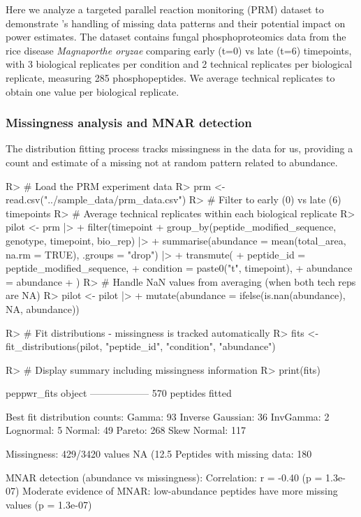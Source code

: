 \documentclass[article]{jss}
\begin{document}
Here we analyze a targeted parallel reaction monitoring (PRM) dataset to demonstrate 's handling of missing data patterns and their potential impact on power estimates. The dataset contains fungal phosphoproteomics data from the rice disease \emph{Magnaporthe oryzae} comparing early (t=0) vs late (t=6) timepoints, with 3 biological replicates per condition and 2 technical replicates per biological replicate, measuring 285 phosphopeptides. We average technical replicates to obtain one value per biological replicate.

\subsubsection{Missingness analysis and MNAR detection}

The distribution fitting process tracks missingness in the data for us, providing a count and estimate of a missing not at random pattern related to abundance.


\begin{Schunk}
\begin{Sinput}
R> # Load the PRM experiment data
R> prm <- read.csv("../sample_data/prm_data.csv")
R> # Filter to early (0) vs late (6) timepoints
R> # Average technical replicates within each biological replicate
R> pilot <- prm |>
+    filter(timepoint %
+    group_by(peptide_modified_sequence, genotype, timepoint, bio_rep) |>
+    summarise(abundance = mean(total_area, na.rm = TRUE), .groups = "drop") |>
+    transmute(
+      peptide_id = peptide_modified_sequence,
+      condition = paste0("t", timepoint),
+      abundance = abundance
+    )
R> # Handle NaN values from averaging (when both tech reps are NA)
R> pilot <- pilot |>
+    mutate(abundance = ifelse(is.nan(abundance), NA, abundance))
\end{Sinput}
\end{Schunk}

\begin{Schunk}
\begin{Sinput}
R> # Fit distributions - missingness is tracked automatically
R> fits <- fit_distributions(pilot, "peptide_id", "condition", "abundance")
\end{Sinput}
\end{Schunk}


\begin{Schunk}
\begin{Sinput}
R> # Display summary including missingness information
R> print(fits)
\end{Sinput}
\begin{Soutput}
peppwr_fits object
------------------
570 peptides fitted

Best fit distribution counts:
  Gamma: 93
  Inverse Gaussian: 36
  InvGamma: 2
  Lognormal: 5
  Normal: 49
  Pareto: 268
  Skew Normal: 117

Missingness: 429/3420 values NA (12.5%
Peptides with missing data: 180

MNAR detection (abundance vs missingness):
  Correlation: r = -0.40 (p = 1.3e-07)
  Moderate evidence of MNAR: low-abundance peptides have more missing values (p = 1.3e-07)
\end{Soutput}
\end{Schunk}
\end{document}

